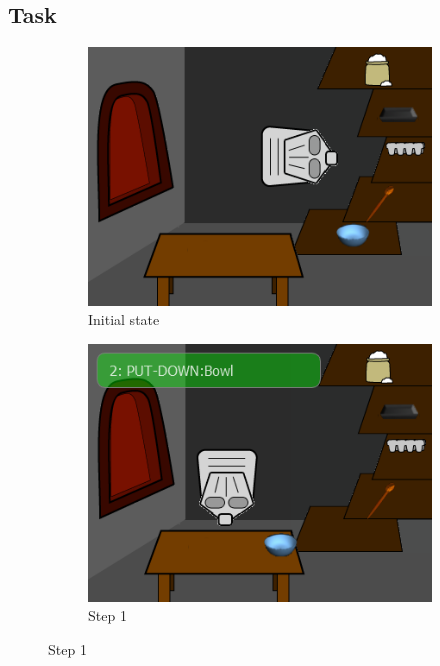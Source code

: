\subsection{Task} \label{ssec:control_task}
\begin{figure}[ht]
	\centering
	\begin{subfigure}[b]{0.3\textwidth}
		\centering
		\includegraphics[width=\textwidth]{step0.png}
		\caption{Initial state}
		\label{fig:control_initial}
	\end{subfigure}
	\centering
	\begin{subfigure}[b]{0.3\textwidth}
		\centering
		\includegraphics[width=\textwidth]{step1.png}
		\caption{Step 1}
		\label{fig:control_bowl}
	\end{subfigure}

\end{figure}
